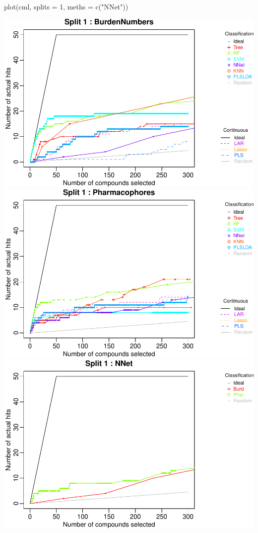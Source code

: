 \begin{Schunk}
\begin{Sinput}
plot(cml, splits = 1, meths = c("NNet"))
\end{Sinput}

\includegraphics{chemmodlabRJournal_files/figure-latex/accumulation_curves-1} 
\includegraphics{chemmodlabRJournal_files/figure-latex/accumulation_curves-2} 
\includegraphics{chemmodlabRJournal_files/figure-latex/accumulation_curves-3} \end{Schunk}

